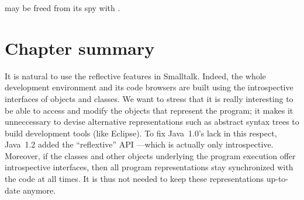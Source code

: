 \documentclass[a4paper,10pt,twoside]{book}
\begin{document}
 may be freed from its spy with .
\section{Chapter summary}

It is natural to use the reflective features in Smalltalk.
Indeed, the whole development environment and its code browsers are built using the introspective interfaces of objects and classes.
We want to stress that it is really interesting to be able to access and modify the objects that represent the program; it makes it unneccessary to devise alternative representations such as abstract syntax trees to build development tools (like Eclipse).
To fix Java~1.0's lack in this respect, Java~1.2 added the ``reflextive'' API ---which is actually only introspective.
Moreover, if the classes and other objects underlying the program execution offer introspective interfaces, then all program representations stay synchronized with the code at all times.
It is thus not needed to keep these representations up-to-date anymore.



\ifx\wholebook\relax\else
\end{document}

